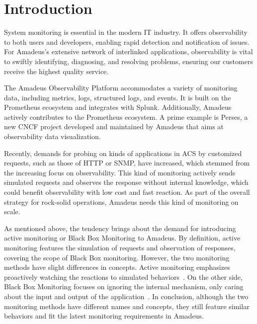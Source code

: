 
\chapter{Introduction}\label{chapter:introduction}

System monitoring is essential in the modern \ac{IT} industry. It offers observability to both users and developers, enabling rapid detection and notification of issues. For Amadeus's extensive network of interlinked applications, observability is vital to swiftly identifying, diagnosing, and resolving problems, ensuring our customers receive the highest quality service. 

The Amadeus Observability Platform accommodates a variety of monitoring data, including metrics, logs, structured logs, and events. It is built on the Prometheus ecosystem and integrates with Splunk. Additionally, Amadeus actively contributes to the Prometheus ecosystem. A prime example is Perses, a new CNCF project developed and maintained by Amadeus that aims at observability data visualization. 

Recently, demands for probing on kinds of applications in \ac{ACS} by customized requests, such as those of \ac{HTTP} or \ac{SNMP}, have increased, which stemmed from the increasing focus on observability. This kind of monitoring actively sends simulated requests and observes the response without internal knowledge, which could benefit observability with low cost and fast reaction. As part of the overall strategy for rock-solid operations, Amadeus needs this kind of monitoring on scale. 

As mentioned above, the tendency brings about the demand for introducing active monitoring or Black Box Monitoring to Amadeus. By definition, active monitoring features the simulation of requests and observation of responses, covering the scope of Black Box monitoring. However, the two monitoring methods have slight differences in concepts. Active monitoring emphasizes proactively watching the reactions to simulated behaviors~\parencite{splunkActiveVsPassive2023}. On the other side, Black Box Monitoring focuses on ignoring the internal mechanism, only caring about the input and output of the application~\parencite{beyerSiteReliabilityEngineering2016}. In conclusion, although the two monitoring methods have different names and concepts, they still feature similar behaviors and fit the latest monitoring requirements in Amadeus. 

